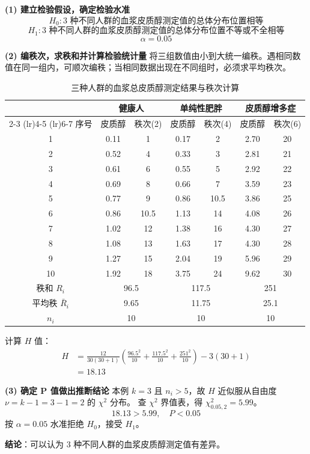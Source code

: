 \documentclass[lang=cn,10pt]{elegantbook}
\begin{document}
\vspace{0.2cm}
\begin{solution}
\textbf{(1) 建立检验假设，确定检验水准}
\[
H_0: \text{3 种不同人群的血浆皮质醇测定值的总体分布位置相等}
\]
\[
H_1: \text{3 种不同人群的血浆皮质醇测定值的总体分布位置不等或不全相等}
\]
\[
\alpha = 0.05
\]

\textbf{(2) 编秩次，求秩和并计算检验统计量}
将三组数值由小到大统一编秩。遇相同数值在同一组内，可顺次编秩；当相同数据出现在不同组时，必须求平均秩次。

\begin{table}[htbp]
\centering
\caption{三种人群的血浆总皮质醇测定结果与秩次计算}
\label{tab:cortisol}
\begin{tabular}{ccccccc}
\toprule
& \multicolumn{2}{c}{健康人} & \multicolumn{2}{c}{单纯性肥胖} & \multicolumn{2}{c}{皮质醇增多症} \\
\cmidrule(lr){2-3} \cmidrule(lr){4-5} \cmidrule(lr){6-7}
序号 & 皮质醇 & 秩次(2) & 皮质醇 & 秩次(4) & 皮质醇 & 秩次(6) \\
\midrule
1 & 0.11 & 1 & 0.17 & 2 & 2.70 & 20 \\
2 & 0.52 & 4 & 0.33 & 3 & 2.81 & 21 \\
3 & 0.61 & 6 & 0.55 & 5 & 2.92 & 22 \\
4 & 0.69 & 8 & 0.66 & 7 & 3.59 & 23 \\
5 & 0.77 & 9 & 0.86 & 10.5 & 3.86 & 25 \\
6 & 0.86 & 10.5 & 1.13 & 14 & 4.08 & 26 \\
7 & 1.02 & 12 & 1.38 & 16 & 4.30 & 27 \\
8 & 1.08 & 13 & 1.63 & 17 & 4.30 & 28 \\
9 & 1.27 & 15 & 2.04 & 19 & 5.96 & 29 \\
10 & 1.92 & 18 & 3.75 & 24 & 9.62 & 30 \\
\midrule
秩和 $R_i$ & \multicolumn{2}{c}{96.5} & \multicolumn{2}{c}{117.5} & \multicolumn{2}{c}{251} \\
平均秩 $\bar{R}_i$ & \multicolumn{2}{c}{9.65} & \multicolumn{2}{c}{11.75} & \multicolumn{2}{c}{25.1} \\
$n_i$ & \multicolumn{2}{c}{10} & \multicolumn{2}{c}{10} & \multicolumn{2}{c}{10} \\
\bottomrule
\end{tabular}
\end{table}

计算 $H$ 值：
\[
\begin{aligned}
H &= \frac{12}{30(30+1)} \left( \frac{96.5^2}{10} + \frac{117.5^2}{10} + \frac{251^2}{10} \right) - 3(30+1) \\
&= 18.13
\end{aligned}
\]

\textbf{(3) 确定 P 值做出推断结论}
本例 $k=3$ 且 $n_i > 5$，故 $H$ 近似服从自由度 $\nu = k-1 = 3-1 = 2$ 的 $\chi^2$ 分布。
查 $\chi^2$ 界值表，得 $\chi^2_{0.05, 2} = 5.99$。
\[
18.13 > 5.99, \quad P < 0.05
\]
按 $\alpha=0.05$ 水准拒绝 $H_0$，接受 $H_1$。

\textbf{结论}：可以认为 3 种不同人群的血浆皮质醇测定值有差异。
\end{solution}
\end{document}
